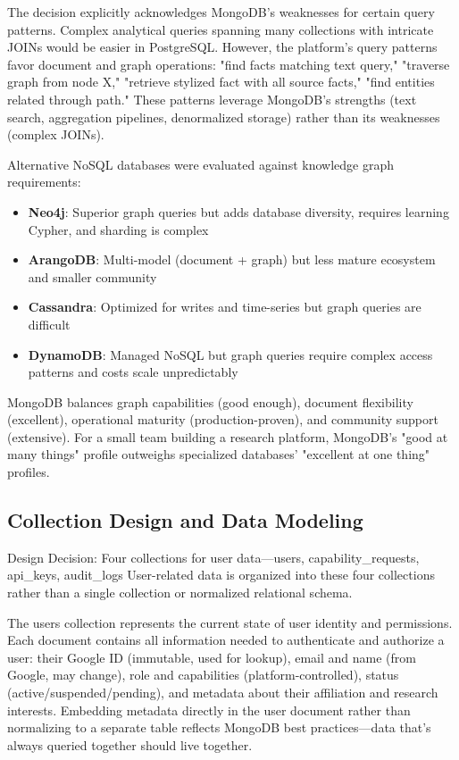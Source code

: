 \documentclass[12pt,a4paper]{article}
\begin{document}
The decision explicitly acknowledges MongoDB's weaknesses for certain query patterns. Complex analytical queries spanning many collections with intricate JOINs would be easier in PostgreSQL. However, the platform's query patterns favor document and graph operations: "find facts matching text query," "traverse graph from node X," "retrieve stylized fact with all source facts," "find entities related through path." These patterns leverage MongoDB's strengths (text search, aggregation pipelines, denormalized storage) rather than its weaknesses (complex JOINs).

Alternative NoSQL databases were evaluated against knowledge graph requirements:
\begin{itemize}[leftmargin=*]
\item \textbf{Neo4j}: Superior graph queries but adds database diversity, requires learning Cypher, and sharding is complex
\item \textbf{ArangoDB}: Multi-model (document + graph) but less mature ecosystem and smaller community
\item \textbf{Cassandra}: Optimized for writes and time-series but graph queries are difficult
\item \textbf{DynamoDB}: Managed NoSQL but graph queries require complex access patterns and costs scale unpredictably
\end{itemize}

MongoDB balances graph capabilities (good enough), document flexibility (excellent), operational maturity (production-proven), and community support (extensive). For a small team building a research platform, MongoDB's "good at many things" profile outweighs specialized databases' "excellent at one thing" profiles.

\subsection{Collection Design and Data Modeling}

\begin{rationale}{Design Decision: Four collections for user data—users, capability\_requests, api\_keys, audit\_logs}
User-related data is organized into these four collections rather than a single collection or normalized relational schema.
\end{rationale}

The users collection represents the current state of user identity and permissions. Each document contains all information needed to authenticate and authorize a user: their Google ID (immutable, used for lookup), email and name (from Google, may change), role and capabilities (platform-controlled), status (active/suspended/pending), and metadata about their affiliation and research interests. Embedding metadata directly in the user document rather than normalizing to a separate table reflects MongoDB best practices—data that's always queried together should live together.
\end{document}

